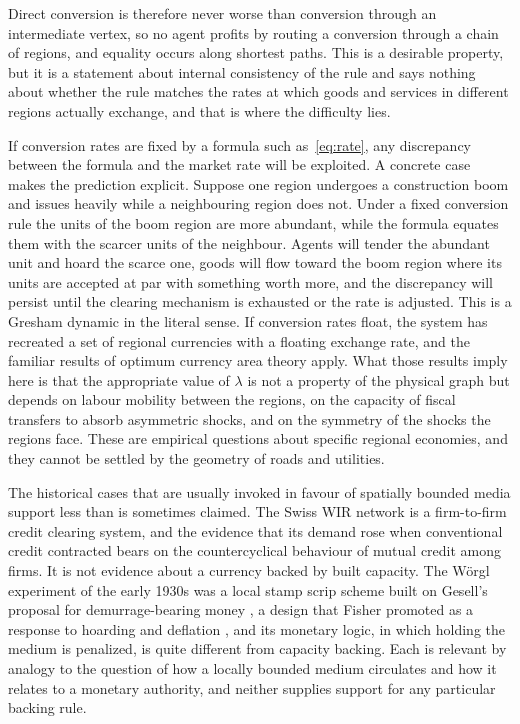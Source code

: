 \documentclass[11pt]{article}
\theoremstyle{definition}
\begin{document}
Direct conversion is therefore never worse than conversion through an intermediate vertex, so no agent profits by routing a conversion through a chain of regions, and equality occurs along shortest paths. This is a desirable property, but it is a statement about internal consistency of the rule and says nothing about whether the rule matches the rates at which goods and services in different regions actually exchange, and that is where the difficulty lies.

If conversion rates are fixed by a formula such as~\eqref{eq:rate}, any discrepancy between the formula and the market rate will be exploited. A concrete case makes the prediction explicit. Suppose one region undergoes a construction boom and issues heavily while a neighbouring region does not. Under a fixed conversion rule the units of the boom region are more abundant, while the formula equates them with the scarcer units of the neighbour. Agents will tender the abundant unit and hoard the scarce one, goods will flow toward the boom region where its units are accepted at par with something worth more, and the discrepancy will persist until the clearing mechanism is exhausted or the rate is adjusted. This is a Gresham dynamic in the literal sense. If conversion rates float, the system has recreated a set of regional currencies with a floating exchange rate, and the familiar results of optimum currency area theory \cite{mundell1961, mckinnon1963, kenen1969} apply. What those results imply here is that the appropriate value of $\lambda$ is not a property of the physical graph but depends on labour mobility between the regions, on the capacity of fiscal transfers to absorb asymmetric shocks, and on the symmetry of the shocks the regions face. These are empirical questions about specific regional economies, and they cannot be settled by the geometry of roads and utilities.

The historical cases that are usually invoked in favour of spatially bounded media support less than is sometimes claimed. The Swiss WIR network is a firm-to-firm credit clearing system, and the evidence that its demand rose when conventional credit contracted \cite{stodder2009} bears on the countercyclical behaviour of mutual credit among firms. It is not evidence about a currency backed by built capacity. The Wörgl experiment of the early 1930s was a local stamp scrip scheme built on Gesell's proposal for demurrage-bearing money \cite{gesell1916}, a design that Fisher promoted as a response to hoarding and deflation \cite{fisher1933}, and its monetary logic, in which holding the medium is penalized, is quite different from capacity backing. Each is relevant by analogy to the question of how a locally bounded medium circulates and how it relates to a monetary authority, and neither supplies support for any particular backing rule.
\end{document}
